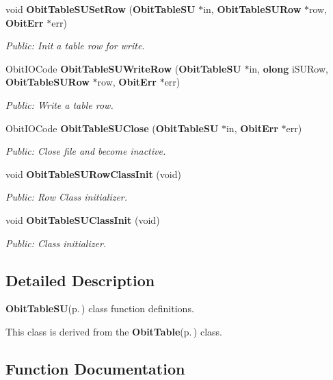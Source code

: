 \begin{CompactItemize}
void {\bf Obit\-Table\-SUSet\-Row} ({\bf Obit\-Table\-SU} $\ast$in, {\bf Obit\-Table\-SURow} $\ast$row, {\bf Obit\-Err} $\ast$err)
\begin{CompactList}\small\item\em Public: Init a table row for write. \item\end{CompactList}\item 
Obit\-IOCode {\bf Obit\-Table\-SUWrite\-Row} ({\bf Obit\-Table\-SU} $\ast$in, {\bf olong} i\-SURow, {\bf Obit\-Table\-SURow} $\ast$row, {\bf Obit\-Err} $\ast$err)
\begin{CompactList}\small\item\em Public: Write a table row. \item\end{CompactList}\item 
Obit\-IOCode {\bf Obit\-Table\-SUClose} ({\bf Obit\-Table\-SU} $\ast$in, {\bf Obit\-Err} $\ast$err)
\begin{CompactList}\small\item\em Public: Close file and become inactive. \item\end{CompactList}\item 
void {\bf Obit\-Table\-SURow\-Class\-Init} (void)
\begin{CompactList}\small\item\em Public: Row Class initializer. \item\end{CompactList}\item 
void {\bf Obit\-Table\-SUClass\-Init} (void)
\begin{CompactList}\small\item\em Public: Class initializer. \item\end{CompactList}\end{CompactItemize}


\subsection{Detailed Description}
{\bf Obit\-Table\-SU}{\rm (p.\,\pageref{structObitTableSU})} class function definitions. 

This class is derived from the {\bf Obit\-Table}{\rm (p.\,\pageref{structObitTable})} class.

\subsection{Function Documentation}
